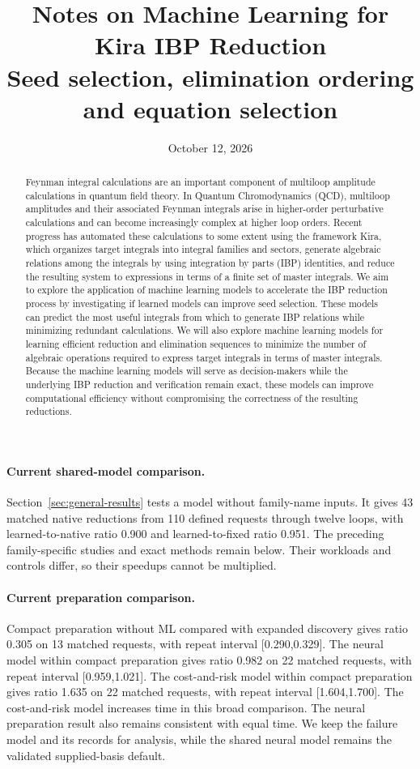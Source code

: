 \documentclass[11pt,a4paper]{article}
\title{\textbf{Notes on Machine Learning for Kira IBP Reduction}\\
  \large Seed selection, elimination ordering and equation selection}
\author{}
\date{October 12, 2026}
\begin{document}
\maketitle
\vspace{-1em}

\begin{abstract}
Feynman integral calculations are an important component of multiloop amplitude calculations in quantum field theory. In Quantum Chromodynamics (QCD), multiloop amplitudes and their associated Feynman integrals arise in higher-order perturbative calculations and can become increasingly complex at higher loop orders. Recent progress has automated these calculations to some extent using the framework Kira, which organizes target integrals into integral families and sectors, generate algebraic relations among the integrals by using integration by parts (IBP) identities, and reduce the resulting system to expressions in terms of a finite set of master integrals. We aim to explore the application of machine learning models to accelerate the IBP reduction process by investigating if learned models can improve seed selection. These models can predict the most useful integrals from which to generate IBP relations while minimizing redundant calculations. We will also explore machine learning models for learning efficient reduction and elimination sequences to minimize the number of algebraic operations required to express target integrals in terms of master integrals. Because the machine learning models will serve as decision-makers while the underlying IBP reduction and verification remain exact, these models can improve computational efficiency without compromising the correctness of the resulting reductions.
\end{abstract}
\paragraph{Current shared-model comparison.} Section~\ref{sec:general-results} tests a model without family-name inputs. It gives 43 matched native reductions from 110 defined requests through twelve loops, with learned-to-native ratio 0.900 and learned-to-fixed ratio 0.951. The preceding family-specific studies and exact methods remain below. Their workloads and controls differ, so their speedups cannot be multiplied.
\paragraph{Current preparation comparison.} Compact preparation without ML compared with expanded discovery gives ratio 0.305 on 13 matched requests, with repeat interval [0.290,0.329]. The neural model within compact preparation gives ratio 0.982 on 22 matched requests, with repeat interval [0.959,1.021]. The cost-and-risk model within compact preparation gives ratio 1.635 on 22 matched requests, with repeat interval [1.604,1.700]. The cost-and-risk model increases time in this broad comparison. The neural preparation result also remains consistent with equal time. We keep the failure model and its records for analysis, while the shared neural model remains the validated supplied-basis default.
\end{document}
